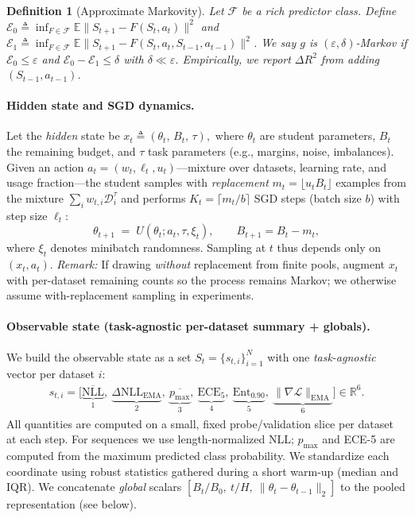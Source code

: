 \documentclass[11pt]{article}
\newtheorem{definition}{Definition}
\newcommand{\E}{\mathbb{E}}
\newcommand{\1}{\mathbf{1}}
\begin{document}
\begin{definition}[Approximate Markovity]
\label{def:approx-markov-tight}
Let $\mathcal{F}$ be a rich predictor class. Define
$\mathcal{E}_0 \triangleq \inf_{F\in\mathcal{F}} \E\| S_{t+1} - F(S_t,a_t)\|^2$
and
$\mathcal{E}_1 \triangleq \inf_{F\in\mathcal{F}} \E\| S_{t+1} - F(S_t,a_t,S_{t-1},a_{t-1})\|^2$.
We say $g$ is $(\varepsilon,\delta)$-Markov if $\mathcal{E}_0 \le \varepsilon$ and
$\mathcal{E}_0 - \mathcal{E}_1 \le \delta$ with $\delta \ll \varepsilon$.
Empirically, we report $\Delta R^2$ from adding $(S_{t-1},a_{t-1})$.
\end{definition}

\paragraph{Hidden state and SGD dynamics.}
Let the \emph{hidden} state be
\(
x_t \triangleq (\theta_t,\,B_t,\,\tau),
\)
where $\theta_t$ are student parameters, $B_t$ the remaining budget, and $\tau$ task parameters (e.g., margins, noise, imbalances).
Given an action $a_t=(w_t,\ell_t,u_t)$---mixture over datasets, learning rate, and usage fraction---the student samples with \emph{replacement} $m_t=\lfloor u_t B_t\rfloor$ examples from the mixture $\sum_i w_{t,i}\mathcal{D}_i^\tau$ and performs $K_t=\lceil m_t/b\rceil$ SGD steps (batch size $b$) with step size $\ell_t$:
\begin{equation}
\theta_{t+1} \;=\; U(\theta_t; a_t, \tau, \xi_t),\qquad B_{t+1}=B_t-m_t,
\end{equation}
where $\xi_t$ denotes minibatch randomness.
Sampling at $t$ thus depends only on $(x_t,a_t)$.
\textit{Remark:} If drawing \emph{without} replacement from finite pools, augment $x_t$ with per-dataset remaining counts so the process remains Markov; we otherwise assume with-replacement sampling in experiments.

\paragraph{Observable state (task-agnostic per-dataset summary + globals).}
We build the observable state as a set $S_t=\{s_{t,i}\}_{i=1}^N$ with one \emph{task-agnostic} vector per dataset $i$:
\begin{align*}
s_{t,i}=\Big[
\underbrace{\overline{\mathrm{NLL}}}_{1},~
\underbrace{\Delta\mathrm{NLL}_{\mathrm{EMA}}}_{2},~
\underbrace{\overline{p_{\max}}}_{3},~
\underbrace{\mathrm{ECE}_{5}}_{4},~
\underbrace{\mathrm{Ent}_{0.90}}_{5},~
\underbrace{\|\nabla \mathcal{L}\|_{\mathrm{EMA}}}_{6}
\Big]\in\mathbb{R}^6.
\end{align*}
All quantities are computed on a small, fixed probe/validation slice per dataset at each step. 
For sequences we use length-normalized NLL; $p_{\max}$ and ECE-5 are computed from the maximum predicted class probability. 
We standardize each coordinate using robust statistics gathered during a short warm-up (median and IQR).
We concatenate \emph{global} scalars $[B_t/B_0,~t/H,~\|\theta_t-\theta_{t-1}\|_2]$ to the pooled representation (see below).
\end{document}
